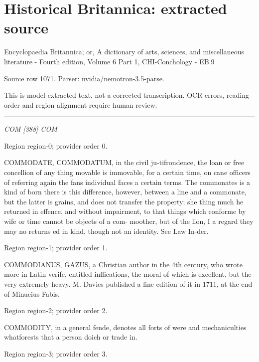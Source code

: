 \documentclass[11pt]{article}
\begin{document}
\section*{Historical Britannica: extracted source}
Encyclopaedia Britannica; or, A dictionary of arts, sciences, and miscellaneous literature - Fourth edition, Volume 6 Part 1, CHI-Conchology - EB.9\par
{\small Source row 1071. Parser: nvidia/nemotron-3.5-parse.\par}
{\small This is model-extracted text, not a corrected transcription. OCR errors, reading order and region alignment require human review.\par}
\hrule\medskip
{\small\itshape COM [388] COM\par}

{\scriptsize\color{gray} Region region-0; provider order 0.\par}
\medskip

COMMODATE, COMMODATUM, in the civil ju-tifrondence, the loan or free concellion of any thing movable is immovable, for a certain time, on cane officers of referring again the fans individual faces a certain terms. The commonates is a kind of born there is this difference, however, between a line and a commonate, but the latter is grains, and does not transfer the property; she thing much he returned in effence, and without impairment, to that things which conforme by wife or time cannot be objects of a com- moother, but of the lion, I a regard they may no returns ed in kind, though not an identity. See Law In-der.
\par

{\scriptsize\color{gray} Region region-1; provider order 1.\par}
\medskip

COMMODIANUS, GAZUS, a Christian author in the 4th century, who wrote more in Latin verife, entitled inflications, the moral of which is excellent, but the very extremely heavy. M. Davies published a fine edition of it in 1711, at the end of Minucius Fabis.
\par

{\scriptsize\color{gray} Region region-2; provider order 2.\par}
\medskip

COMMODITY, in a general fende, denotes all forts of were and mechaniculties whatforests that a person doich or trade in.
\par

{\scriptsize\color{gray} Region region-3; provider order 3.\par}
\medskip
\end{document}
